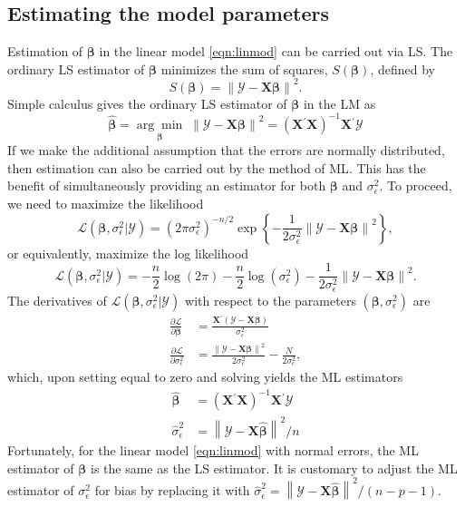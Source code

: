 \documentclass[cmfont,usenames,dvipsnames,leqno]{afit-etd}\usepackage[]{graphicx}\usepackage[]{color}
\newcommand{\loglik}{\mathscr{L}}
\newcommand{\norm}[1]{\left\|#1\right\|}
\newcommand{\trans}{\ensuremath{^\prime}}
\newcommand{\bc}[1]{\ensuremath{\bm{\mathcal{#1}}}}
\newcommand{\mc}[1]{\ensuremath{\mathcal{#1}}}
\newcommand{\wh}[1]{\ensuremath{\widehat{#1}}}
\newcommand{\argmin}[1]{\underset{#1}{\operatorname{arg}\!\operatorname{min}}\;}
\newcommand{\X}{\ensuremath{\bm{X}}}
\begin{document}
\subsection{Estimating the model parameters}
Estimation of $\bm{\beta}$ in the linear model \eqref{eqn:linmod} can be carried out via \ac{LS}. The ordinary \ac{LS} estimator of $\bm{\beta}$ minimizes the sum of squares, $S\left(\bm{\beta}\right)$, defined by
\begin{equation}
\label{eqn:ss-linmod}
  S(\bm{\beta}) = \norm{\bc{Y} - \X\bm{\beta}}^2.
\end{equation}
Simple calculus gives the ordinary \ac{LS} estimator of $\bm{\beta}$ in the \ac{LM} as 
\begin{equation}
\label{eqn:beta-ols}
  \wh{\bm{\beta}} = \argmin{\bm{\beta}} \norm{\bc{Y} - \X\bm{\beta}}^2 = \left(\X\trans\X\right)^{-1}\X\trans\bc{Y}
\end{equation}
If we make the additional assumption that the errors are normally distributed, then estimation can also be carried out by the method of \ac{ML}. This has the benefit of simultaneously providing an estimator for both $\bm{\beta}$ and $\sigma_\epsilon^2$. To proceed, we need to maximize the likelihood
\begin{equation*}
  \mc{L}\left(\bm{\beta}, \sigma_\epsilon^2 | \bc{Y}\right) = \left(2\pi\sigma_\epsilon^2\right)^{-n/2}\exp\left\{ -\frac{1}{2\sigma_\epsilon^2}\norm{\bc{Y} - \X\bm{\beta}}^2 \right\},
\end{equation*}
or equivalently, maximize the log likelihood
\begin{equation*}
  \loglik\left(\bm{\beta}, \sigma_\epsilon^2 | \bc{Y}\right) = -\frac{n}{2}\log\left(2\pi\right) - \frac{n}{2}\log\left(\sigma_\epsilon^2\right) - \frac{1}{2\sigma_\epsilon^2}\norm{\bc{Y} - \X\bm{\beta}}^2.
\end{equation*}
The derivatives of $\loglik(\bm{\beta}, \sigma_\epsilon^2 | \bc{Y})$ with respect to the parameters $\left(\bm{\beta}, \sigma_\epsilon^2\right)$ are
\begin{align*}
  \frac{\partial\loglik}{\partial\bm{\beta}} &= \frac{\X\trans(\bc{Y} - \X\bm{\beta})}{\sigma_\epsilon^2}\\
  \frac{\partial\loglik}{\partial\sigma_\epsilon^2} &= \frac{\norm{\bc{Y} - \X\bm{\beta}}^2}{2\sigma_\epsilon^2} - \frac{N}{2\sigma_\epsilon^2},
\end{align*}
which, upon setting equal to zero and solving yields the \ac{ML} estimators
\begin{align*}
  \wh{\bm{\beta}} &= (\X\trans\X)^{-1}\X\trans\bc{Y} \\
  \wh{\sigma}_\epsilon^2 &= \norm{\bc{Y} - \X\wh{\bm{\beta}}}^2/n
\end{align*}
Fortunately, for the linear model \eqref{eqn:linmod} with normal errors, the \ac{ML} estimator of $\bm{\beta}$ is the same as the \ac{LS} estimator. It is customary to adjust the \ac{ML} estimator of $\sigma_\epsilon^2$ for bias by replacing it with $\wh{\sigma}_\epsilon^2 = \norm{\bc{Y} - \X\wh{\bm{\beta}}}^2/(n-p-1)$.
\end{document}
